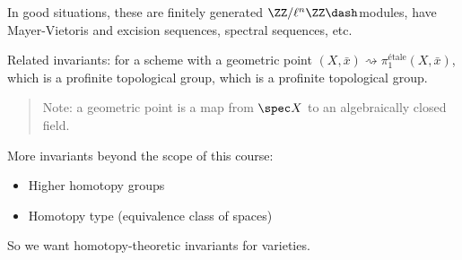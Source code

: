 In good situations, these are finitely generated
\(\ZZ/\ell^n\ZZ\dash\)modules, have Mayer-Vietoris and excision
sequences, spectral sequences, etc.

Related invariants: for a scheme with a geometric point
\((X, \bar x) \rightsquigarrow \pi_1^{\text{étale}}(X, \bar x)\), which
is a profinite topological group, which is a profinite topological
group.

\begin{quote}
Note: a geometric point is a map from \(\spec X\) to an algebraically
closed field.
\end{quote}

More invariants beyond the scope of this course:

\begin{itemize}
\tightlist
\item
  Higher homotopy groups
\item
  Homotopy type (equivalence class of spaces)
\end{itemize}

So we want homotopy-theoretic invariants for varieties.


